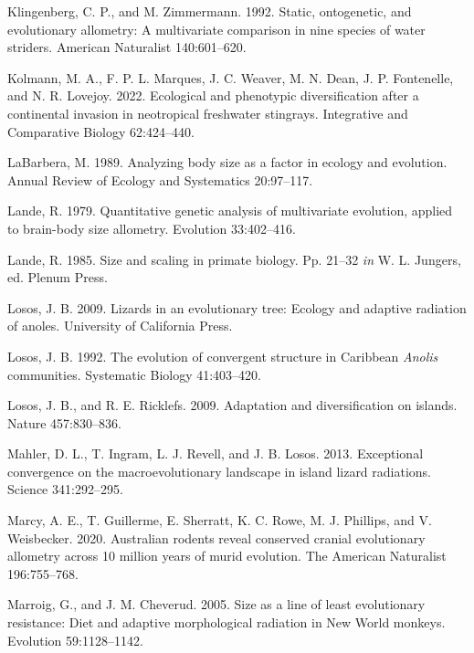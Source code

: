\documentclass[
  11pt,
]{article}
\begin{document}
\leavevmode\hypertarget{ref-Klingenberg1992}{}%
Klingenberg, C. P., and M. Zimmermann. 1992. Static, ontogenetic, and
evolutionary allometry: A multivariate comparison in nine species of
water striders. American Naturalist 140:601--620.

\leavevmode\hypertarget{ref-Kolmann2022}{}%
Kolmann, M. A., F. P. L. Marques, J. C. Weaver, M. N. Dean, J. P.
Fontenelle, and N. R. Lovejoy. 2022. Ecological and phenotypic
diversification after a continental invasion in neotropical freshwater
stingrays. Integrative and Comparative Biology 62:424--440.

\leavevmode\hypertarget{ref-LaBarbera1989}{}%
LaBarbera, M. 1989. Analyzing body size as a factor in ecology and
evolution. Annual Review of Ecology and Systematics 20:97--117.

\leavevmode\hypertarget{ref-Lande1979}{}%
Lande, R. 1979. Quantitative genetic analysis of multivariate evolution,
applied to brain-body size allometry. Evolution 33:402--416.

\leavevmode\hypertarget{ref-Lande1985}{}%
Lande, R. 1985. Size and scaling in primate biology. Pp. 21--32
\emph{in} W. L. Jungers, ed. Plenum Press.

\leavevmode\hypertarget{ref-Losos2009}{}%
Losos, J. B. 2009. Lizards in an evolutionary tree: Ecology and adaptive
radiation of anoles. University of California Press.

\leavevmode\hypertarget{ref-Losos1992}{}%
Losos, J. B. 1992. The evolution of convergent structure in Caribbean
\emph{Anolis} communities. Systematic Biology 41:403--420.

\leavevmode\hypertarget{ref-Losos2009b}{}%
Losos, J. B., and R. E. Ricklefs. 2009. Adaptation and diversification
on islands. Nature 457:830--836.

\leavevmode\hypertarget{ref-Mahler2013}{}%
Mahler, D. L., T. Ingram, L. J. Revell, and J. B. Losos. 2013.
Exceptional convergence on the macroevolutionary landscape in island
lizard radiations. Science 341:292--295.

\leavevmode\hypertarget{ref-Marcy2020}{}%
Marcy, A. E., T. Guillerme, E. Sherratt, K. C. Rowe, M. J. Phillips, and
V. Weisbecker. 2020. Australian rodents reveal conserved cranial
evolutionary allometry across 10 million years of murid evolution. The
American Naturalist 196:755--768.

\leavevmode\hypertarget{ref-MarroigCheverud2005}{}%
Marroig, G., and J. M. Cheverud. 2005. Size as a line of least
evolutionary resistance: Diet and adaptive morphological radiation in
New World monkeys. Evolution 59:1128--1142.
\end{document}
